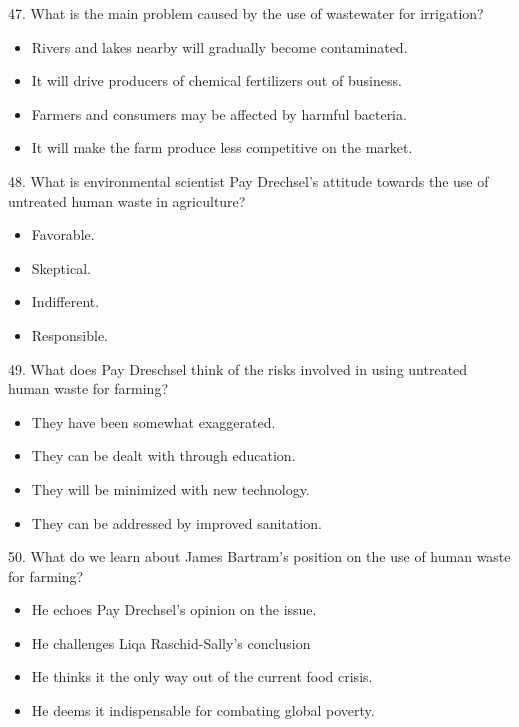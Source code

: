 \documentclass[UTF8,11pt]{ctexart}
\begin{document}
47. What is the main problem caused by the use of wastewater for irrigation?


\begin{itemize}[leftmargin=2em,itemsep=.2em,topsep=.4em]\item[A.] Rivers and lakes nearby will gradually become contaminated.
\item[B.] It will drive producers of chemical fertilizers out of business.
\item[C.] Farmers and consumers may be affected by harmful bacteria.
\item[D.] It will make the farm produce less competitive on the market.
\end{itemize}

48. What is environmental scientist Pay Drechsel’s attitude towards the use of untreated human waste in agriculture?


\begin{itemize}[leftmargin=2em,itemsep=.2em,topsep=.4em]\item[A.] Favorable.
\item[B.] Skeptical.
\item[C.] Indifferent.
\item[D.] Responsible.
\end{itemize}

49. What does Pay Dreschsel think of the risks involved in using untreated human waste for farming?


\begin{itemize}[leftmargin=2em,itemsep=.2em,topsep=.4em]\item[A.] They have been somewhat exaggerated.
\item[B.] They can be dealt with through education.
\item[C.] They will be minimized with new technology.
\item[D.] They can be addressed by improved sanitation.
\end{itemize}

50. What do we learn about James Bartram’s position on the use of human waste for farming?


\begin{itemize}[leftmargin=2em,itemsep=.2em,topsep=.4em]\item[A.] He echoes Pay Drechsel’s opinion on the issue.
\item[B.] He challenges Liqa Raschid-Sally’s conclusion
\item[C.] He thinks it the only way out of the current food crisis.
\item[D.] He deems it indispensable for combating global poverty.
\end{itemize}
\end{document}
